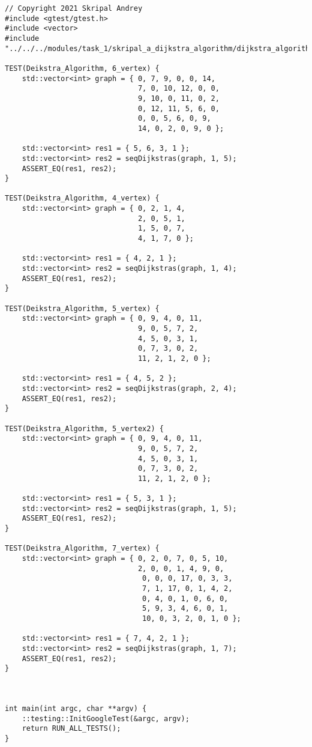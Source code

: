 \documentclass{report}
\begin{document}
\begin{lstlisting}
// Copyright 2021 Skripal Andrey
#include <gtest/gtest.h>
#include <vector>
#include "../../../modules/task_1/skripal_a_dijkstra_algorithm/dijkstra_algorithm.h"

TEST(Deikstra_Algorithm, 6_vertex) {
    std::vector<int> graph = { 0, 7, 9, 0, 0, 14,
                               7, 0, 10, 12, 0, 0,
                               9, 10, 0, 11, 0, 2,
                               0, 12, 11, 5, 6, 0,
                               0, 0, 5, 6, 0, 9,
                               14, 0, 2, 0, 9, 0 };

    std::vector<int> res1 = { 5, 6, 3, 1 };
    std::vector<int> res2 = seqDijkstras(graph, 1, 5);
    ASSERT_EQ(res1, res2);
}

TEST(Deikstra_Algorithm, 4_vertex) {
    std::vector<int> graph = { 0, 2, 1, 4,
                               2, 0, 5, 1,
                               1, 5, 0, 7,
                               4, 1, 7, 0 };

    std::vector<int> res1 = { 4, 2, 1 };
    std::vector<int> res2 = seqDijkstras(graph, 1, 4);
    ASSERT_EQ(res1, res2);
}

TEST(Deikstra_Algorithm, 5_vertex) {
    std::vector<int> graph = { 0, 9, 4, 0, 11,
                               9, 0, 5, 7, 2,
                               4, 5, 0, 3, 1,
                               0, 7, 3, 0, 2,
                               11, 2, 1, 2, 0 };

    std::vector<int> res1 = { 4, 5, 2 };
    std::vector<int> res2 = seqDijkstras(graph, 2, 4);
    ASSERT_EQ(res1, res2);
}

TEST(Deikstra_Algorithm, 5_vertex2) {
    std::vector<int> graph = { 0, 9, 4, 0, 11,
                               9, 0, 5, 7, 2,
                               4, 5, 0, 3, 1,
                               0, 7, 3, 0, 2,
                               11, 2, 1, 2, 0 };

    std::vector<int> res1 = { 5, 3, 1 };
    std::vector<int> res2 = seqDijkstras(graph, 1, 5);
    ASSERT_EQ(res1, res2);
}

TEST(Deikstra_Algorithm, 7_vertex) {
    std::vector<int> graph = { 0, 2, 0, 7, 0, 5, 10,
                               2, 0, 0, 1, 4, 9, 0,
                                0, 0, 0, 17, 0, 3, 3,
                                7, 1, 17, 0, 1, 4, 2,
                                0, 4, 0, 1, 0, 6, 0,
                                5, 9, 3, 4, 6, 0, 1,
                                10, 0, 3, 2, 0, 1, 0 };

    std::vector<int> res1 = { 7, 4, 2, 1 };
    std::vector<int> res2 = seqDijkstras(graph, 1, 7);
    ASSERT_EQ(res1, res2);
}



int main(int argc, char **argv) {
    ::testing::InitGoogleTest(&argc, argv);
    return RUN_ALL_TESTS();
}

\end{lstlisting}
\end{document}
